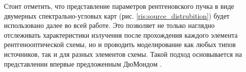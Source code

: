 Стоит отметить, что представление параметров рентгеновского пучка
 в виде двумерных спектрально-угловых карт (рис. \ref{ris:source_distrubition})
 будет использовано далее во всей работе. Это позволяет не только наглядно отслеживать
характеристики излучения после прохождения каждого элемента рентгенооптической
схемы, но и проводить моделирование как любых типов источников, так
и для разных элементов схемы. Такой подход основывается на представлении впервые предложенным
ДюМондом \cite{Dumond1937}.

